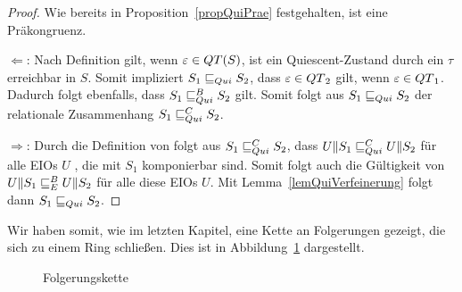 \begin{proof}
  Wie bereits in Proposition~\ref{propQuiPrae} festgehalten, ist \QRel{} eine
  Präkongruenz.

  \glqq{}$\Leftarrow$\grqq{}: Nach Definition gilt, wenn
  $\varepsilon\in QT{}(S)$, ist ein Quiescent-Zustand durch ein $\tau$
  erreichbar in $S$. Somit impliziert $S_1\sqsubseteq _{Qui} S_2$, dass
  $\varepsilon\in QT{}_2$ gilt, wenn $ \varepsilon\in QT{}_1$. Dadurch folgt
  ebenfalls, dass $S_1\sqsubseteq _{Qui}^B S_2$ gilt. Somit folgt aus $S_1\sqsubseteq _{Qui} S_2$ der
  relationale Zusammenhang $S_1\sqsubseteq _{Qui}^C S_2$.

  \glqq{}$\Rightarrow$\grqq{}: Durch die Definition von \QCRel{} folgt aus
  $S_1\sqsubseteq _{Qui}^C{} S_2$, dass $U\|S_1\sqsubseteq _{Qui}^C U\|S_2$ für alle EIOs $U$ , die mit
  $S_1$ komponierbar sind. Somit folgt auch die Gültigkeit von $U\|S_1\sqsubseteq _E^B
  U\|S_2$ für alle diese EIOs $U$. Mit Lemma~\ref{lemQuiVerfeinerung} folgt
  dann $S_1\sqsubseteq _{Qui}{} S_2$.
\end{proof}

Wir haben somit, wie im letzten Kapitel, eine Kette an Folgerungen gezeigt, die
sich zu einem Ring schließen. Dies ist in Abbildung~\ref{FolgerungsketteQui}
dargestellt.

\begin{figure}[h!tbp]
  \begin{center}
    \caption{Folgerungskette}
    \label{FolgerungsketteQui}
  \end{center}
\end{figure}

